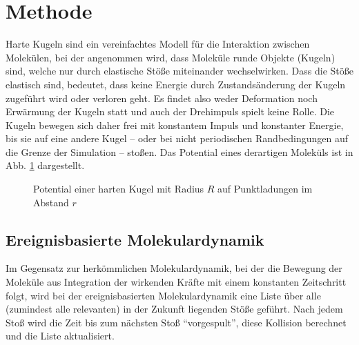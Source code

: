 \section{Methode }
Harte Kugeln sind ein vereinfachtes Modell für die Interaktion zwischen Molekülen, bei der angenommen wird, dass Moleküle runde Objekte (Kugeln) sind, welche nur durch elastische Stöße miteinander wechselwirken.
Dass die Stöße elastisch sind, bedeutet, dass keine Energie durch Zustandsänderung der Kugeln zugeführt wird oder verloren geht. Es findet also weder Deformation noch Erwärmung der Kugeln statt und auch der Drehimpuls spielt keine Rolle. Die Kugeln bewegen sich daher frei mit konstantem Impuls und konstanter Energie, bis sie auf eine andere Kugel -- oder bei nicht periodischen Randbedingungen auf die Grenze der Simulation -- stoßen. Das Potential eines derartigen Moleküls ist in Abb. \ref{fig:hkpotential} dargestellt.
\begin{figure}[H] \centering
{}
\caption{Potential einer harten Kugel mit Radius $R$ auf Punktladungen im Abstand $r$}
 \label{fig:hkpotential}
\end{figure} 

\subsection{Ereignisbasierte Molekulardynamik}

Im Gegensatz zur herkömmlichen Molekulardynamik, bei der die Bewegung der Moleküle aus Integration der wirkenden Kräfte mit einem konstanten Zeitschritt folgt, wird bei der ereignisbasierten Molekulardynamik eine Liste über alle (zumindest alle relevanten) in der Zukunft liegenden Stöße geführt. Nach jedem Stoß wird die Zeit bis zum nächsten Stoß ``vorgespult'', diese Kollision berechnet und die Liste aktualisiert.

